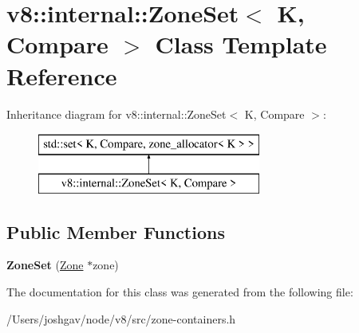 \hypertarget{classv8_1_1internal_1_1_zone_set}{}\section{v8\+:\+:internal\+:\+:Zone\+Set$<$ K, Compare $>$ Class Template Reference}
\label{classv8_1_1internal_1_1_zone_set}
Inheritance diagram for v8\+:\+:internal\+:\+:Zone\+Set$<$ K, Compare $>$\+:\begin{figure}[H]
\begin{center}
\leavevmode
\includegraphics[height=2.000000cm]{classv8_1_1internal_1_1_zone_set}
\end{center}
\end{figure}
\subsection*{Public Member Functions}
\begin{DoxyCompactItemize}
\item 
{\bfseries Zone\+Set} (\hyperlink{classv8_1_1internal_1_1_zone}{Zone} $\ast$zone)\hypertarget{classv8_1_1internal_1_1_zone_set_a01a7e1f0423f0b3d88e34ffcdc79360d}{}\label{classv8_1_1internal_1_1_zone_set_a01a7e1f0423f0b3d88e34ffcdc79360d}

\end{DoxyCompactItemize}


The documentation for this class was generated from the following file\+:\begin{DoxyCompactItemize}
\item 
/\+Users/joshgav/node/v8/src/zone-\/containers.\+h\end{DoxyCompactItemize}
